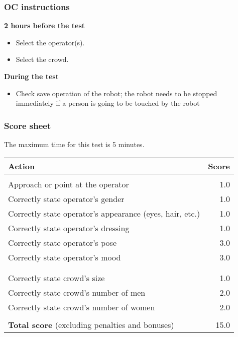 %

\subsubsection{OC instructions}

\textbf{2 hours before the test}
\begin{itemize}
\item Select the  operator(s).
\item Select the crowd.
\end{itemize}

\textbf{During the test}
\begin{itemize}
\item Check save operation of the robot; the robot needs to be stopped immediately if a person is going to be touched by the robot
\end{itemize}

\subsubsection{Score sheet}
The maximum time for this test is 5 minutes.

\begin{tabularx}{\textwidth}{ X r }
	\textbf{Action} & \textbf{Score} \\ \hline
	\textbi{Operator}  \\
	Approach or point at the operator & 1.0 \\
	Correctly state operator's gender & 1.0 \\
	Correctly state operator's appearance (eyes, hair, etc.) & 1.0 \\
	Correctly state operator's dressing & 1.0 \\
	Correctly state operator's pose & 3.0 \\
	Correctly state operator's mood & 3.0 \\
	\\
	\textbi{Crowd} \\
	Correctly state crowd's size & 1.0 \\
	Correctly state crowd's number of men & 2.0 \\
	Correctly state crowd's number of women & 2.0 \\
	\\ \hline
	\textbf{Total score} (excluding penalties and bonuses) & 15.0 \\
\end{tabularx}